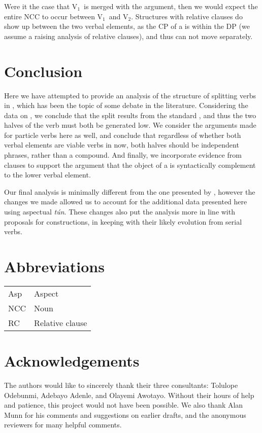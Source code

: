 \documentclass[output=paper,newtxmath,modfonts,nonflat,draftmode]{langsci/langscibook}
\begin{document}
Were it the case that V$_{1}$\ is merged with the argument, then we would expect the entire NCC to occur between V$_{1}$\ and V$_{2}$. 
Structures with relative clauses do show up between the two verbal elements, as the CP of a  is within the DP (we assume a raising analysis of relative clauses), and thus can not move separately.

\section{Conclusion}
\label{sect:parrish:conclusion}

Here we have attempted to provide an analysis of the structure of splitting verbs in , which has been the topic of some debate in the literature. Considering the data on , we conclude that the split results from the standard  , and thus the two halves of the verb must both be generated low. We consider the arguments made for particle verbs here as well, and conclude that regardless of whether both verbal elements are viable verbs in  now, both halves should be independent phrases, rather than a compound. And finally, we incorporate evidence from   clauses to support the argument that the object of a  is syntactically complement to the lower verbal element.

Our final analysis is minimally different from the one presented by \citet{Bode2007}, however the changes we made allowed us to account for the additional data presented here using aspectual \textit{tún}. These changes also put the analysis more in line with proposals for  constructions, in keeping with their likely evolution from serial verbs.

\section*{Abbreviations} 
	
	\begin{tabular}{ll}   
		Asp & Aspect \\
		NCC & Noun \isi{complement clause} \\
		RC & Relative clause \\ 
	\end{tabular}
	 

\section*{Acknowledgements}
The authors would like to sincerely thank their three consultants: Tolulope Odebunmi, Adebayo Adenle, and Olayemi Awotayo. Without their hours of help and patience, this project would not have been possible. We also thank Alan Munn for his comments and suggestions on earlier drafts, and the anonymous reviewers for many helpful comments.


\printbibliography[heading=subbibliography,notkeyword=this]
\end{document}
